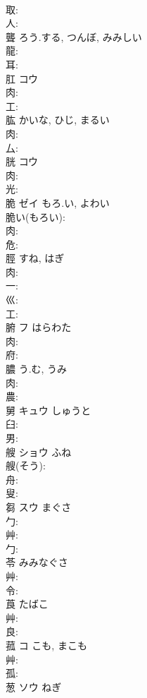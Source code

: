 \documentclass[8pt]{extreport}
\begin{document}
\begin{CJK}{UTF8}{min}
\\	取: 
\\	人: 
\\	聾		ろう.する, つんぼ, みみしい			
\\	龍: 
\\	耳: 
\\	肛	コウ			
\\	肉: 
\\	工: 
\\	肱		かいな, ひじ, まるい			
\\	肉: 
\\	厶: 
\\	胱	コウ			
\\	肉: 
\\	光: 
\\	脆	ゼイ	もろ.い, よわい		
\\	脆い(もろい): 
\\	肉: 
\\	危: 
\\	脛		すね, はぎ			
\\	肉: 
\\	一: 
\\	巛: 
\\	工: 
\\	腑	フ	はらわた		
\\	肉: 
\\	府: 
\\	膿		う.む, うみ			
\\	肉: 
\\	農: 
\\	舅	キュウ	しゅうと		
\\	臼: 
\\	男: 
\\	艘	ショウ	ふね		
\\	艘(そう): 
\\	舟: 
\\	叟: 
\\	芻	スウ	まぐさ		
\\	勹: 
\\	艸: 
\\	勹: 
\\	苓		みみなぐさ			
\\	艸: 
\\	令: 
\\	莨		たばこ			
\\	艸: 
\\	良: 
\\	菰	コ	こも, まこも		
\\	艸: 
\\	孤: 
\\	葱	ソウ	ねぎ		

\end{CJK}
\end{document}
